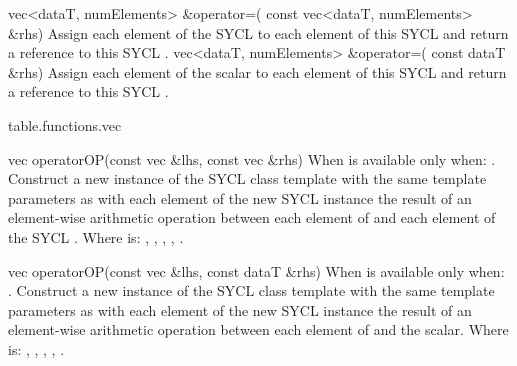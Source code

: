   \addRowTwoL
    {vec<dataT, numElements> \&operator=(}
    {  const vec<dataT, numElements> \&rhs)}
    {
      Assign each element of the  SYCL  to each element of this SYCL  and return a reference to this SYCL .
    }
  \addRowTwoL
    {vec<dataT, numElements> \&operator=(}
    {  const dataT \&rhs)}
    {
      Assign each element of the  scalar to each element of this SYCL  and return a reference to this SYCL .
    }
 \completeTable

{table.functions.vec}

  \addRow
  {vec operatorOP(const vec \&lhs, const vec \&rhs)}
  {
    When  is \codeinline{\%} available only when: .
    \newline
    Construct a new instance of the SYCL  class template with the same template parameters as   with each element of the new SYCL  instance the result of an element-wise  arithmetic operation between each element of   and each element of the  SYCL .
    \newline \newline
    Where  is: \codeinline{+}, \codeinline{-}, \codeinline{*}, \codeinline{/}, \codeinline{\%}.
  }

  \addRow
  {vec operatorOP(const vec \&lhs, const dataT \&rhs)}
  {
    When  is \codeinline{\%} available only when: .
    \newline
    Construct a new instance of the SYCL  class template with the same template parameters as   with each element of the new SYCL  instance the result of an element-wise  arithmetic operation between each element of   and the  scalar.
    \newline \newline
    Where  is: \codeinline{+}, \codeinline{-}, \codeinline{*}, \codeinline{/}, \codeinline{\%}.
  }

